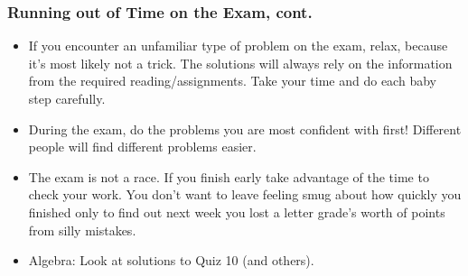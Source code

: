 \documentclass[14pt]{beamer}
\begin{document}
\begin{frame}
\frametitle{Running out of Time on the Exam, cont.}
\footnotesize
\begin{itemize}
\item If you encounter an unfamiliar type of problem on the exam, relax, because it's most likely not a trick.  The solutions will always rely on the information from the required reading/assignments.  Take your time and do each baby step carefully.  
\item During the exam, do the problems you are most confident with first!  Different people will find different problems easier.
\item The exam is not a race.  If you finish early take advantage of the time to check your work.  You don't want to leave feeling smug about how quickly you finished only to find out next week you lost a letter grade's worth of points from silly mistakes.
\item Algebra: Look at solutions to Quiz 10 (and others).
\end{itemize}
\end{frame}

\begin{comment}
\end{comment}
\end{document}
